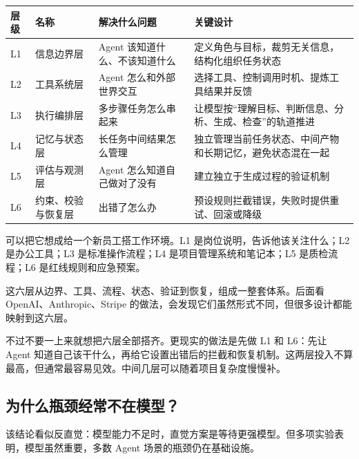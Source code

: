 \documentclass[9pt,a4paper,twocolumn]{ctexart}
\begin{document}
{\footnotesize
\begin{tabular}{|p{}|p{}|p{}|p{}|}
\hline
\textbf{层级} & \textbf{名称} & \textbf{解决什么问题} & \textbf{关键设计} \\
\hline
L1 & 信息边界层 & Agent 该知道什么、不该知道什么 & 定义角色与目标，裁剪无关信息，结构化组织任务状态 \\
\hline
L2 & 工具系统层 & Agent 怎么和外部世界交互 & 选择工具、控制调用时机、提炼工具结果并反馈 \\
\hline
L3 & 执行编排层 & 多步骤任务怎么串起来 & 让模型按“理解目标、判断信息、分析、生成、检查”的轨道推进 \\
\hline
L4 & 记忆与状态层 & 长任务中间结果怎么管理 & 独立管理当前任务状态、中间产物和长期记忆，避免状态混在一起 \\
\hline
L5 & 评估与观测层 & Agent 怎么知道自己做对了没有 & 建立独立于生成过程的验证机制 \\
\hline
L6 & 约束、校验与恢复层 & 出错了怎么办 & 预设规则拦截错误，失败时提供重试、回滚或降级 \\
\hline
\end{tabular}
}



可以把它想成给一个新员工搭工作环境。L1 是岗位说明，告诉他该关注什么；L2 是办公工具；L3 是标准操作流程；L4 是项目管理系统和笔记本；L5 是质检流程；L6 是红线规则和应急预案。



这六层从边界、工具、流程、状态、验证到恢复，组成一整套体系。后面看 OpenAI、Anthropic、Stripe 的做法，会发现它们虽然形式不同，但很多设计都能映射到这六层。



不过不要一上来就想把六层全部搭齐。更现实的做法是先做 L1 和 L6：先让 Agent 知道自己该干什么，再给它设置出错后的拦截和恢复机制。这两层投入不算最高，但通常最容易见效。中间几层可以随着项目复杂度慢慢补。



\subsection*{为什么瓶颈经常不在模型？}


该结论看似反直觉：模型能力不足时，直觉方案是等待更强模型。但多项实验表明，模型虽然重要，多数 Agent 场景的瓶颈仍在基础设施。
\end{document}
